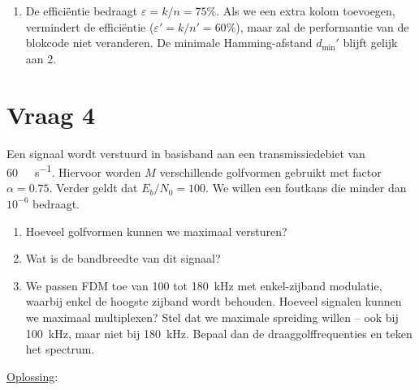\documentclass[kulak]{kulakarticle}
\let\epsilon\varepsilon
\begin{document}
\begin{enumerate}
		\item De efficiëntie bedraagt \(\epsilon = k/n = 75\%\). Als we een extra kolom toevoegen, vermindert de efficiëntie (\(\epsilon' = k/n' = 60\%\)), maar zal de performantie van de blokcode niet veranderen. De minimale Hamming-afstand \(d_{\min}'\) blijft gelijk aan 2.
	\end{enumerate}

	\section*{Vraag 4}

	Een signaal wordt verstuurd in basisband aan een transmissiedebiet van \SI{60}{\kilo\bit\per\second}. Hiervoor worden \(M\) verschillende golfvormen gebruikt met factor \(\alpha = 0.75\). Verder geldt dat \(E_b/N_0=100\). We willen een foutkans die minder dan \(10^{-6}\) bedraagt.

	\begin{enumerate}
		\item Hoeveel golfvormen kunnen we maximaal versturen?
		\item Wat is de bandbreedte van dit signaal?
		\item We passen FDM toe van 100 tot \SI{180}{\kilo\hertz} met enkel-zijband modulatie, waarbij enkel de hoogste zijband wordt behouden. Hoeveel signalen kunnen we maximaal multiplexen? Stel dat we maximale spreiding willen -- ook bij \SI{100}{\kilo\hertz}, maar niet bij \SI{180}{\kilo\hertz}. Bepaal dan de draaggolffrequenties en teken het spectrum.
	\end{enumerate}

	\newpage
	\underline{Oplossing}:
\end{document}
